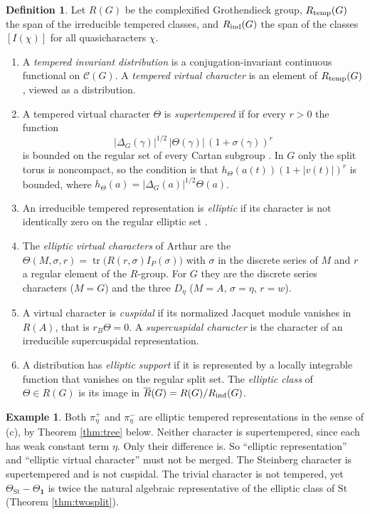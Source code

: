 \documentclass[12pt,letterpaper]{amsart}
\numberwithin{equation}{section}
\theoremstyle{definition}
\newtheorem{definition}[theorem]{Definition}
\newtheorem{example}[theorem]{Example}
\theoremstyle{remark}
\newcommand{\St}{\mathrm{St}}
\newcommand{\triv}{\mathbf 1}
\newcommand{\tr}{\operatorname{tr}}
\begin{document}
\begin{definition}\label{def:six}
Let $R(G)$ be the complexified Grothendieck group, $R_{\rm temp}(G)$ the span of the irreducible tempered classes, and $R_{\rm ind}(G)$ the span of the classes $[I(\chi)]$ for all quasicharacters $\chi$.
\begin{enumerate}[label=(\alph*),leftmargin=*]
\item A \emph{tempered invariant distribution} is a conjugation-invariant continuous functional on $\mathcal C(G)$. A \emph{tempered virtual character} is an element of $R_{\rm temp}(G)$, viewed as a distribution.
\item A tempered virtual character $\Theta$ is \emph{supertempered} if for every $r>0$ the function\[|\Delta_G(\gamma)|^{1/2}\,|\Theta(\gamma)|\,(1+\sigma(\gamma))^r\]is bounded on the regular set of every Cartan subgroup \cite{He94}. In $G$ only the split torus is noncompact, so the condition is that $h_\Theta(a(t))(1+|v(t)|)^r$ is bounded, where $h_\Theta(a)=|\Delta_G(a)|^{1/2}\Theta(a)$.
\item An irreducible tempered representation is \emph{elliptic} if its character is not identically zero on the regular elliptic set \cite{Ar93}.
\item The \emph{elliptic virtual characters} of Arthur are the $\Theta(M,\sigma,r)=\tr\bigl(R(r,\sigma)I_P(\sigma)\bigr)$ with $\sigma$ in the discrete series of $M$ and $r$ a regular element of the $R$-group. For $G$ they are the discrete series characters ($M=G$) and the three $D_\eta$ ($M=A$, $\sigma=\eta$, $r=w$).
\item A virtual character is \emph{cuspidal} if its normalized Jacquet module vanishes in $R(A)$, that is $r_B\Theta=0$. A \emph{supercuspidal character} is the character of an irreducible supercuspidal representation.
\item A distribution has \emph{elliptic support} if it is represented by a locally integrable function that vanishes on the regular split set. The \emph{elliptic class} of $\Theta\in R(G)$ is its image in $\overline R(G)=R(G)/R_{\rm ind}(G)$.
\end{enumerate}
\end{definition}
\begin{example}
Both $\pi_\eta^+$ and $\pi_\eta^-$ are elliptic tempered representations in the sense of (c), by Theorem \ref{thm:tree} below. Neither character is supertempered, since each has weak constant term $\eta$. Only their difference is. So ``elliptic representation'' and ``elliptic virtual character'' must not be merged. The Steinberg character is supertempered and is not cuspidal. The trivial character is not tempered, yet $\Theta_{\St}-\Theta_{\triv}$ is twice the natural algebraic representative of the elliptic class of $\St$ (Theorem \ref{thm:twosplit}).
\end{example}
\end{document}
